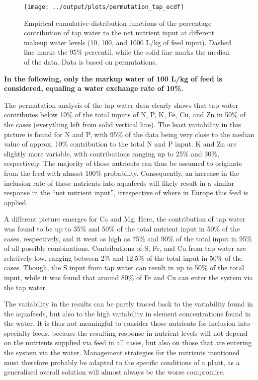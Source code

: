 \documentclass[
]{article}
\begin{document}
\begin{figure}
\texttt{[image: ../output/plots/permutation\_tap\_ecdf]} \caption{Empirical cumulative distribution functions of the percentage contribution of tap water to the net nutrient input at different makeup water levels (10, 100, and 1000 L/kg of feed input). Dashed line marks the 95\% percentil, while the solid line marks the median of the data. Data is based on permutations.}\label{fig:permutation_tap}
\end{figure}

\textbf{In the following, only the markup water of 100 L/kg of feed is
considered, equaling a water exchange rate of 10\%.}

The permutation analysis of the tap water data clearly shows that tap
water contributes below 10\% of the total inputs of N, P, K, Fe, Cu, and
Zn in 50\% of the cases (everything left from solid vertical line). The
least variability in this picture is found for N and P, with 95\% of the
data being very close to the median value of approx, 10\% contribution
to the total N and P input. K and Zn are slightly more variable, with
contributions ranging up to 25\% and 30\%, respectively. The majority of
those nutrients can thus be assumed to originate from the feed with
almost 100\% probability. Consequently, an increase in the inclusion
rate of those nutrients into aquafeeds will likely result in a similar
response in the ``net nutrient input'', irrespective of where in Europe
this feed is applied.

A different picture emerges for Ca and Mg. Here, the contribution of tap
water was found to be up to 35\% and 50\% of the total nutrient input in
50\% of the cases, respectively, and it went as high as 75\% and 90\% of
the total input in 95\% of all possible combinations. Contributions of
S, Fe, and Cu from tap water are relatively low, ranging between 2\% and
12.5\% of the total input in 50\% of the cases. Though, the S input from
tap water can result in up to 50\% of the total input, while it was
found that around 80\% of Fe and Cu can enter the system via the tap
water.

The variability in the results can be partly traced back to the
variability found in the aquafeeds, but also to the high variability in
element concentrations found in the water. It is thus not meaningful to
consider those nutrients for inclusion into specialty feeds, because the
resulting response in nutrient levels will not depend on the nutrients
supplied via feed in all cases, but also on those that are entering the
system via the water. Management strategies for the nutrients mentioned
must therefore probably be adapted to the specific conditions of a
plant, as a generalised overall solution will almost always be the worse
compromise.
\end{document}
